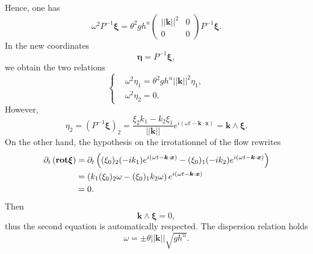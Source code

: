 \documentclass[a4paper, 11pt]{article}
\begin{document}
Hence, one has
\begin{equation*}
\omega^2P^{-1}\boldsymbol{\xi}=\theta^2 gh^n\begin{pmatrix}||\boldsymbol{k}||^2&0\\ 0 &0\end{pmatrix}P^{-1}\boldsymbol{\xi}.
\end{equation*}
In the new coordinates 
\begin{equation*}
\boldsymbol{\eta}=P^{-1}\boldsymbol{\xi},
\end{equation*}
we obtain the two relations
\begin{equation*}
\left\{\begin{split}
&\omega^2\eta_1=\theta^2 gh^n||\boldsymbol{k}||^2\eta_1,\\
&\omega^2\eta_2=0.
\end{split}\right.
\end{equation*}
However, \begin{equation*}
\eta_2=(P^{-1}\boldsymbol{\xi})_2=\frac{\xi_2k_1-k_2\xi_1}{||\boldsymbol{k}||}e^{i(\omega t-\boldsymbol{k}\cdot \boldsymbol{x})}=\boldsymbol{k}\wedge\boldsymbol{\xi}.
\end{equation*}
On the other hand, the hypothesis on the irrotationnel of the flow rewrites
\begin{equation*}
\begin{split}
\partial_t\left(\text{\textbf{rot}}\boldsymbol{\xi}\right)&=\partial_t\left((\xi_0)_2(-ik_1)e^{i(\omega t-\boldsymbol{k}\cdot \boldsymbol{x})}-(\xi_0)_1(-ik_2)e^{i(\omega t-\boldsymbol{k}\cdot \boldsymbol{x})}\right)\\
&=\left(k_1(\xi_0)_2\omega-(\xi_0)_1k_2\omega\right)e^{i(\omega t-\boldsymbol{k}\cdot \boldsymbol{x})}\\
&=0.
\end{split}
\end{equation*}
Then
\begin{equation*}
\boldsymbol{k}\wedge\boldsymbol{\xi}=0, 
\end{equation*}
thus the second equation is automatically respected. The dispersion relation holds
\begin{equation*}
\omega=\pm \theta||\boldsymbol{k}||\sqrt{gh^n}.
\end{equation*}
\end{document}
